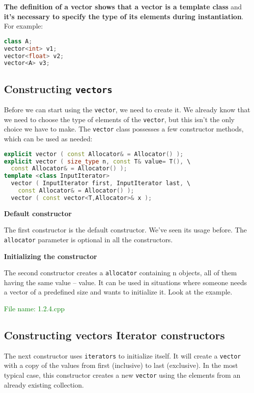 \textbf{The definition of a vector shows that a vector is a template class} and \textbf{it’s necessary 
to specify the type of its elements during instantiation}.
For example:
\begin{lstlisting}[language=C++]
class A;
vector<int> v1;
vector<float> v2;
vector<A> v3;
\end{lstlisting}

\subsection{Constructing \texttt{vectors}} %
Before we can start using the \texttt{vector}, we need to create it. We already know that we need 
to choose the type of elements of the \texttt{vector}, but this isn’t the only choice we have to make. 
The \texttt{vector} class possesses a few constructor methods, which can be used as needed:
\begin{lstlisting}[language=C++]
explicit vector ( const Allocator& = Allocator() );
explicit vector ( size_type n, const T& value= T(), \
  const Allocator& = Allocator() );
template <class InputIterator>
  vector ( InputIterator first, InputIterator last, \
    const Allocator& = Allocator() );
  vector ( const vector<T,Allocator>& x );
\end{lstlisting}

\textbf{Default constructor}

The first constructor is the default constructor. We’ve seen its usage before. The \texttt{allocator} 
parameter is optional in all the constructors.

\textbf{Initializing the constructor}

The second constructor creates a \texttt{allocator} containing n objects, all of them having the same 
value – value. It can be used in situations where someone needs a vector of a predefined size and wants 
to initialize it. Look at the example.

\textcolor{green}{File name: 1.2.4.cpp}


\subsection{Constructing vectors Iterator constructors} %
The next constructor uses \texttt{iterators} to initialize itself. It will create a 
\texttt{vector} with a copy of the values from first (inclusive) to last (exclusive). 
In the most typical case, this constructor creates a new \texttt{vector} using the 
elements from an already existing collection.

